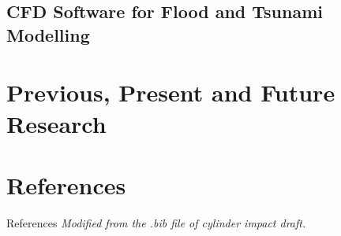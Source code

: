 \documentclass[USenglish, mathserif]{beamer}
\newcommand{\setfont}[2]{{\fontfamily{#1}\selectfont #2}}
\numberwithin{equation}{section}
\numberwithin{figure}{section}
\begin{document}
\subsection{CFD Software for Flood and Tsunami Modelling}


\section{Previous, Present and Future Research}
  
  
\section{References}
\begin{frame}[allowframebreaks]{References}
	\textit{Modified from the .bib file of cylinder impact draft.}
	
	\nocite{*}
	\small
\end{frame}

%
%

%
%
% 
%
%



  
  
\end{document}
